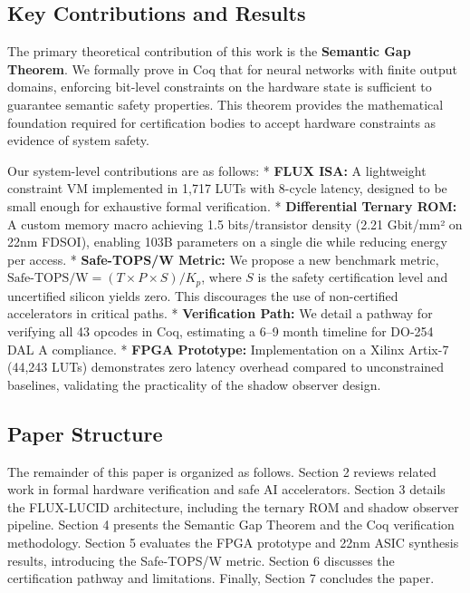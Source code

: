 \documentclass[conference]{IEEEtran}
\begin{document}
\subsection{Key Contributions and Results}

The primary theoretical contribution of this work is the \textbf{Semantic Gap Theorem}. We formally prove in Coq that for neural networks with finite output domains, enforcing bit-level constraints on the hardware state is sufficient to guarantee semantic safety properties. This theorem provides the mathematical foundation required for certification bodies to accept hardware constraints as evidence of system safety.

Our system-level contributions are as follows:
*   \textbf{FLUX ISA:} A lightweight constraint VM implemented in 1,717 LUTs with 8-cycle latency, designed to be small enough for exhaustive formal verification.
*   \textbf{Differential Ternary ROM:} A custom memory macro achieving 1.5 bits/transistor density (2.21 Gbit/mm² on 22nm FDSOI), enabling 103B parameters on a single die while reducing energy per access.
*   \textbf{Safe-TOPS/W Metric:} We propose a new benchmark metric, $\text{Safe-TOPS/W} = (T \times P \times S) / K_p$, where $S$ is the safety certification level and uncertified silicon yields zero. This discourages the use of non-certified accelerators in critical paths.
*   \textbf{Verification Path:} We detail a pathway for verifying all 43 opcodes in Coq, estimating a 6–9 month timeline for DO-254 DAL A compliance.
*   \textbf{FPGA Prototype:} Implementation on a Xilinx Artix-7 (44,243 LUTs) demonstrates zero latency overhead compared to unconstrained baselines, validating the practicality of the shadow observer design.

\subsection{Paper Structure}

The remainder of this paper is organized as follows. Section 2 reviews related work in formal hardware verification and safe AI accelerators. Section 3 details the FLUX-LUCID architecture, including the ternary ROM and shadow observer pipeline. Section 4 presents the Semantic Gap Theorem and the Coq verification methodology. Section 5 evaluates the FPGA prototype and 22nm ASIC synthesis results, introducing the Safe-TOPS/W metric. Section 6 discusses the certification pathway and limitations. Finally, Section 7 concludes the paper.
\end{document}
